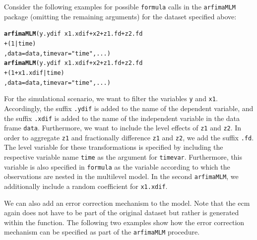 \documentclass[12pt]{paper}\usepackage[]{graphicx}\usepackage[]{color}
\makeatletter
\newcommand{\hlnum}[1]{\textcolor[rgb]{0.686,0.059,0.569}{#1}}%
\newcommand{\hlstr}[1]{\textcolor[rgb]{0.192,0.494,0.8}{#1}}%
\newcommand{\hlopt}[1]{\textcolor[rgb]{0,0,0}{#1}}%
\newcommand{\hlstd}[1]{\textcolor[rgb]{0.345,0.345,0.345}{#1}}%
\newcommand{\hlkwc}[1]{\textcolor[rgb]{0.333,0.667,0.333}{#1}}%
\newcommand{\hlkwd}[1]{\textcolor[rgb]{0.737,0.353,0.396}{\textbf{#1}}}%
\newenvironment{kframe}{%
 \def\at@end@of@kframe{}%
 \ifinner\ifhmode%
  \def\at@end@of@kframe{\end{minipage}}%
  \begin{minipage}{\columnwidth}%
 \fi\fi%
 \def\FrameCommand##1{\hskip\@totalleftmargin \hskip-\fboxsep
 \colorbox{shadecolor}{##1}\hskip-\fboxsep
     \hskip-\linewidth \hskip-\@totalleftmargin \hskip\columnwidth}%
 \MakeFramed {\advance\hsize-\width
   \@totalleftmargin\z@ \linewidth\hsize
   \@setminipage}}%
 {\par\unskip\endMakeFramed%
 \at@end@of@kframe}
\newenvironment{knitrout}{}{} %
\makeatother
\begin{document}
Consider the following examples for possible \texttt{formula} calls in the \texttt{arfimaMLM} package (omitting the remaining arguments) for the dataset specified above:

\begin{knitrout}
\color{fgcolor}\begin{kframe}
\begin{alltt}
\hlkwd{arfimaMLM}\hlstd{(y.ydif} \hlopt{~} \hlstd{x1.xdif} \hlopt{+} \hlstd{x2} \hlopt{+} \hlstd{z1.fd} \hlopt{+} \hlstd{z2.fd}
          \hlopt{+} \hlstd{(}\hlnum{1}\hlopt{|}\hlstd{time)}
          \hlstd{,} \hlkwc{data}\hlstd{=data,} \hlkwc{timevar} \hlstd{=} \hlstr{"time"}\hlstd{, ...)}
\hlkwd{arfimaMLM}\hlstd{(y.ydif} \hlopt{~} \hlstd{x1.xdif} \hlopt{+} \hlstd{x2} \hlopt{+} \hlstd{z1.fd} \hlopt{+} \hlstd{z2.fd}
          \hlopt{+} \hlstd{(}\hlnum{1}\hlopt{+}\hlstd{x1.xdif}\hlopt{|}\hlstd{time)}
          \hlstd{,} \hlkwc{data}\hlstd{=data,} \hlkwc{timevar} \hlstd{=} \hlstr{"time"}\hlstd{, ...)}
\end{alltt}
\end{kframe}
\end{knitrout}

For the simulational scenario, we want to filter the variables \texttt{y} and \texttt{x1}. Accordingly, the suffix \texttt{.ydif} is added to the name of the dependent variable, and the suffix \texttt{.xdif} is added to the name of the independent variable in the data frame \texttt{data}. Furthermore, we want to include the level effects of \texttt{z1} and \texttt{z2}. In order to aggregate \texttt{z1} and fractionally difference \texttt{z1} and \texttt{z2}, we add the suffix \texttt{.fd}. The level variable for these transformations is specified by including the respective variable name \texttt{time} as the argument for \texttt{timevar}. Furthermore, this variable is also specified in \texttt{formula} as the variable according to which the observations are nested in the multilevel model. In the second \texttt{arfimaMLM}, we additionally include a random coefficient for \texttt{x1.xdif}.

We can also add an error correction mechanism to the model. Note that the ecm again does not have to be part of the original dataset but rather is generated within the function. The following two examples show how the error correction mechanism can be specified as part of the \texttt{arfimaMLM} procedure.
\end{document}
